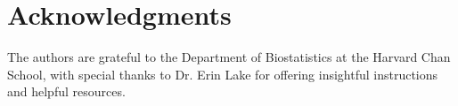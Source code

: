 \documentclass[article]{jss}
\begin{document}
\section*{Acknowledgments}
The authors are grateful to the Department of Biostatistics at the Harvard Chan School, with special thanks to Dr. Erin Lake for offering insightful instructions and helpful resources.

\clearpage







\newpage
\end{document}

